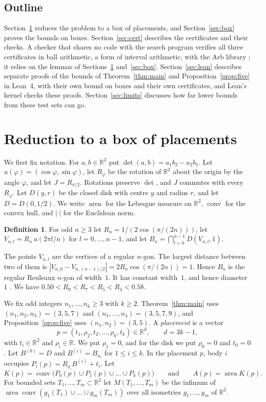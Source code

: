 \documentclass[11pt]{amsart}
\theoremstyle{definition}
\newtheorem{definition}[theorem]{Definition}
\theoremstyle{remark}
\numberwithin{equation}{section}
\newcommand{\R}{\mathbb{R}}
\newcommand{\area}{\operatorname{area}}
\newcommand{\conv}{\operatorname{conv}}
\begin{document}
\subsection*{Outline}
Section~\ref{sec:reduction} reduces the problem to a box of placements, and Section~\ref{sec:box} proves the bounds on boxes. Section~\ref{sec:cert} describes the certificates and their checks. A checker that shares no code with the search program verifies all three certificates in ball arithmetic, a form of interval arithmetic, with the Arb library \cite{Joh17}; it relies on the lemmas of Sections~\ref{sec:reduction} and~\ref{sec:box}. Section~\ref{sec:lean} describes separate proofs of the bounds of Theorem~\ref{thm:main} and Proposition~\ref{prop:five} in Lean~4, with their own bound on boxes and their own certificates, and Lean's kernel checks these proofs. Section~\ref{sec:limits} discusses how far lower bounds from these test sets can go.

\section{Reduction to a box of placements}\label{sec:reduction}

We first fix notation. For $a,b\in\R^2$ put $\det(a,b)=a_1b_2-a_2b_1$. Let $u(\varphi)=(\cos\varphi,\sin\varphi)$, let $R_\varphi$ be the rotation of $\R^2$ about the origin by the angle $\varphi$, and let $J=R_{\pi/2}$. Rotations preserve $\det$, and $J$ commutes with every $R_\varphi$. Let $D(y,r)$ be the closed disk with centre $y$ and radius $r$, and let $D=D(0,1/2)$. We write $\area$ for the Lebesgue measure on $\R^2$, $\conv$ for the convex hull, and $|\cdot|$ for the Euclidean norm.

\begin{definition}\label{def:reuleaux}
For odd $n\ge3$ let $R_n=1/(2\cos(\pi/(2n)))$, let $V_{n,l}=R_n\,u(2\pi l/n)$ for $l=0,\dots,n-1$, and let $B_n=\bigcap_{l=0}^{n-1}D(V_{n,l},1)$.
\end{definition}

The points $V_{n,l}$ are the vertices of a regular $n$-gon. The largest distance between two of them is $|V_{n,0}-V_{n,(n-1)/2}|=2R_n\cos(\pi/(2n))=1$. Hence $B_n$ is the regular Reuleaux $n$-gon of width~$1$. It has constant width~$1$, and hence diameter~$1$ \cite{MMO19}. We have $0.50<R_9<R_7<R_5<R_3<0.58$.

We fix odd integers $n_1,\dots,n_k\ge3$ with $k\ge2$. Theorem~\ref{thm:main} uses $(n_1,n_2,n_3)=(3,5,7)$ and $(n_1,\dots,n_4)=(3,5,7,9)$, and Proposition~\ref{prop:five} uses $(n_1,n_2)=(3,5)$. A \emph{placement} is a vector
\[
p=(t_1,\rho_2,t_2,\dots,\rho_k,t_k)\in\R^d,\qquad d=3k-1,
\]
with $t_i\in\R^2$ and $\rho_i\in\R$. We put $\rho_1=0$, and for the disk we put $\rho_0=0$ and $t_0=0$. Let $B^{(0)}=D$ and $B^{(i)}=B_{n_i}$ for $1\le i\le k$. In the placement $p$, body $i$ occupies $P_i(p)=R_{\rho_i}B^{(i)}+t_i$. Let
\[
K(p)=\conv\bigl(P_0(p)\cup P_1(p)\cup\dots\cup P_k(p)\bigr)\qquad\text{and}\qquad A(p)=\area K(p).
\]
For bounded sets $T_1,\dots,T_m\subset\R^2$ let $M(T_1,\dots,T_m)$ be the infimum of $\area\conv(g_1(T_1)\cup\dots\cup g_m(T_m))$ over all isometries $g_1,\dots,g_m$ of $\R^2$.
\end{document}
